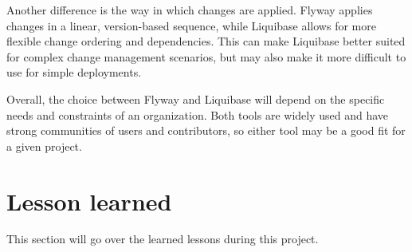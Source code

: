 Another difference is the way in which changes are applied. Flyway applies changes in a linear, version-based sequence, while Liquibase allows for more flexible change ordering and dependencies. This can make Liquibase better suited for complex change management scenarios, but may also make it more difficult to use for simple deployments.

Overall, the choice between Flyway and Liquibase will depend on the specific needs and constraints of an organization. Both tools are widely used and have strong communities of users and contributors, so either tool may be a good fit for a given project.







\section{Lesson learned}
This section will go over the learned lessons during this project.











